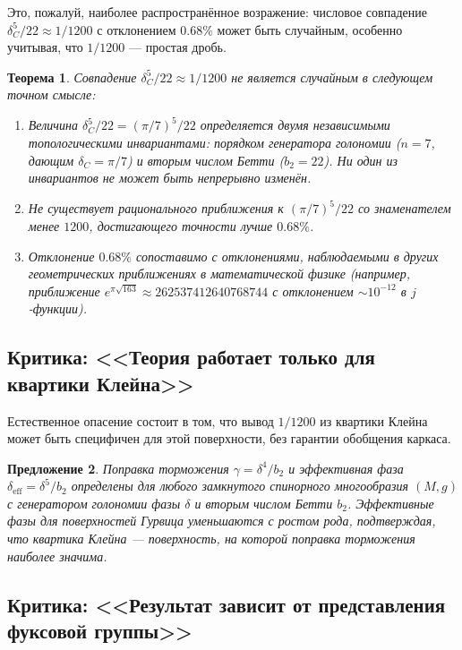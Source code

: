 \documentclass[12pt,a4paper]{article}
\newtheorem{theorem}{Теорема}[section]
\newtheorem{proposition}[theorem]{Предложение}
\theoremstyle{definition}
\theoremstyle{remark}
\begin{document}
Это, пожалуй, наиболее распространённое возражение: числовое совпадение $\delta_C^5/22 \approx 1/1200$ с отклонением $0.68\%$ может быть случайным, особенно учитывая, что $1/1200$ --- простая дробь.

\begin{theorem}
\label{thm:non-coincidental-ru}
Совпадение $\delta_C^5/22 \approx 1/1200$ не является случайным в следующем точном смысле:
\begin{enumerate}[label=(\roman*)]
\item Величина $\delta_C^5/22 = (\pi/7)^5/22$ определяется двумя независимыми топологическими инвариантами: порядком генератора голономии ($n = 7$, дающим $\delta_C = \pi/7$) и вторым числом Бетти ($b_2 = 22$). Ни один из инвариантов не может быть непрерывно изменён.
\item Не существует рационального приближения к $(\pi/7)^5/22$ со знаменателем менее $1200$, достигающего точности лучше $0.68\%$.
\item Отклонение $0.68\%$ сопоставимо с отклонениями, наблюдаемыми в других геометрических приближениях в математической физике (например, приближение $e^{\pi\sqrt{163}} \approx 262537412640768744$ с отклонением $\sim 10^{-12}$ в $j$-функции).
\end{enumerate}
\end{theorem}

\subsection{Критика: <<Теория работает только для квартики Клейна>>}

Естественное опасение состоит в том, что вывод $1/1200$ из квартики Клейна может быть специфичен для этой поверхности, без гарантии обобщения каркаса.

\begin{proposition}
\label{prop:universality-criticism-ru}
Поправка торможения $\gamma = \delta^4/b_2$ и эффективная фаза $\delta_{\mathrm{eff}} = \delta^5/b_2$ определены для любого замкнутого спинорного многообразия $(M, g)$ с генератором голономии фазы $\delta$ и вторым числом Бетти $b_2$. Эффективные фазы для поверхностей Гурвица уменьшаются с ростом рода, подтверждая, что квартика Клейна --- поверхность, на которой поправка торможения наиболее значима.
\end{proposition}

\subsection{Критика: <<Результат зависит от представления фуксовой группы>>}
\end{document}
